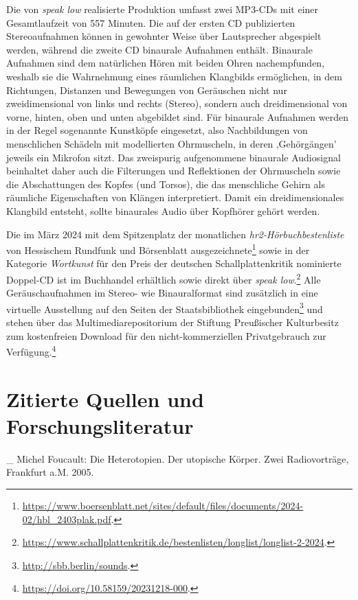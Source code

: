 \documentclass[a4paper,
fontsize=11pt,
oneside,
numbers=noperiodatend,
parskip=half-,
bibliography=totoc,
final
]{scrartcl}
\begin{document}
Die von \emph{speak low} realisierte Produktion umfasst zwei MP3-CDs mit
einer Gesamtlaufzeit von 557 Minuten. Die auf der ersten CD publizierten
Stereoaufnahmen können in gewohnter Weise über Lautsprecher abgespielt
werden, während die zweite CD binaurale Aufnahmen enthält. Binaurale
Aufnahmen sind dem natürlichen Hören mit beiden Ohren nachempfunden,
weshalb sie die Wahrnehmung eines räumlichen Klangbilds ermöglichen, in
dem Richtungen, Distanzen und Bewegungen von Geräuschen nicht nur
zweidimensional von links und rechts (Stereo), sondern auch
dreidimensional von vorne, hinten, oben und unten abgebildet sind. Für
binaurale Aufnahmen werden in der Regel sogenannte Kunstköpfe
eingesetzt, also Nachbildungen von menschlichen Schädeln mit
modellierten Ohrmuscheln, in deren ‚Gehörgängen' jeweils ein Mikrofon
sitzt. Das zweispurig aufgenommene binaurale Audiosignal beinhaltet
daher auch die Filterungen und Reflektionen der Ohrmuscheln sowie die
Abschattungen des Kopfes (und Torsos), die das menschliche Gehirn als
räumliche Eigenschaften von Klängen interpretiert. Damit ein
dreidimensionales Klangbild entsteht, sollte binaurales Audio über
Kopfhörer gehört werden.

Die im März 2024 mit dem Spitzenplatz der monatlichen
\emph{hr2-Hörbuchbestenliste} von Hessischem Rundfunk und Börsenblatt
ausgezeichnete\footnote{\url{https://www.boersenblatt.net/sites/default/files/documents/2024-02/hbl_2403plak.pdf}.}
sowie in der Kategorie \emph{Wortkunst} für den Preis der deutschen
Schallplattenkritik nominierte Doppel-CD ist im Buchhandel erhältlich
sowie direkt über \emph{speak low}.\footnote{\url{https://www.schallplattenkritik.de/bestenlisten/longlist/longlist-2-2024}.}
Alle Geräuschaufnahmen im Stereo- wie Binauralformat sind zusätzlich in
eine virtuelle Ausstellung auf den Seiten der Staatsbibliothek
eingebunden\footnote{\url{http://sbb.berlin/sounds}.} und stehen über
das Multimediarepositorium der Stiftung Preußischer Kulturbesitz zum
kostenfreien Download für den nicht-kommerziellen Privatgebrauch zur
Verfügung.\footnote{\url{https://doi.org/10.58159/20231218-000}.}

\hypertarget{zitierte-quellen-und-forschungsliteratur}{%
\section{Zitierte Quellen und
Forschungsliteratur}\label{zitierte-quellen-und-forschungsliteratur}}

\_ Michel Foucault: Die Heterotopien. Der utopische Körper. Zwei
Radiovorträge, Frankfurt a.M. 2005.
\end{document}
